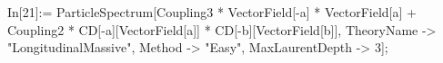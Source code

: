 In[21]:= ParticleSpectrum[Coupling3 * VectorField[-a] * VectorField[a] + Coupling2 * CD[-a][VectorField[a]] * CD[-b][VectorField[b]], TheoryName -> "LongitudinalMassive", Method -> "Easy", MaxLaurentDepth -> 3]; 
